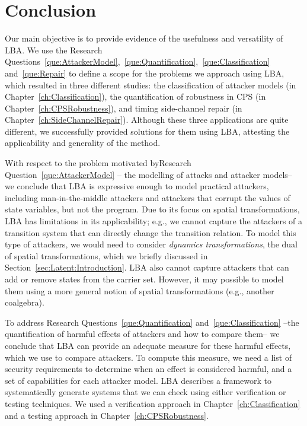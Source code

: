 \chapter{Conclusion}
Our main objective is to provide evidence of the usefulness and versatility of LBA. We use the Research Questions~\ref{que:AttackerModel},~\ref{que:Quantification},~\ref{que:Classification} and~\ref{que:Repair} to define a scope for the problems we approach using LBA, which resulted in three different studies: the classification of attacker models (in Chapter~\ref{ch:Classification}), the quantification of robustness in CPS (in Chapter~\ref{ch:CPSRobustness}), and timing side-channel repair (in Chapter~\ref{ch:SideChannelRepair}). Although these three applications are quite different, we successfully provided solutions for them using LBA, attesting the applicability and generality of the method. 

With respect to the problem motivated byResearch Question~\ref{que:AttackerModel} -- the modelling of attacks and attacker models-- we conclude that LBA is expressive enough to model practical attackers, including man-in-the-middle attackers and attackers that corrupt the values of state variables, but not the program. Due to its focus on spatial transformations, LBA has limitations in its applicability; e.g., we cannot capture the attackers of a transition system that can directly change the transition relation. To model this type of attackers, we would need to consider \emph{dynamics transformations}, the dual of spatial transformations, which we briefly discussed in Section~\ref{sec:Latent:Introduction}. LBA also cannot capture attackers that can add or remove states from the carrier set. However, it may possible to model them using a more general notion of spatial transformations (e.g., another coalgebra). 

To address Research Questions~\ref{que:Quantification} and~\ref{que:Classification} --the quantification of harmful effects of attackers and how to compare them-- we conclude that LBA can provide an adequate measure for these harmful effects, which we use to compare attackers. To compute this measure, we need a list of security requirements to determine when an effect is considered harmful, and a set of capabilities for each attacker model. LBA describes a framework to systematically generate systems that we can check using either verification or testing techniques. We used a verification approach in Chapter~\ref{ch:Classification} and a testing approach in Chapter~\ref{ch:CPSRobustness}. 

